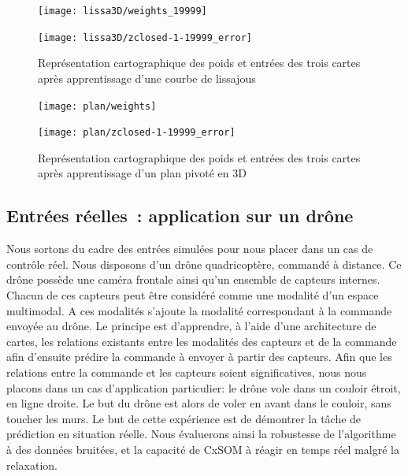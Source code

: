 \documentclass[../main]{subfiles}
\begin{document}
\begin{figure}
\begin{minipage}{0.48\textwidth}
\centering\texttt{[image: lissa3D/weights\_19999]}
\end{minipage}
\begin{minipage}{0.48\textwidth}
\texttt{[image: lissa3D/zclosed-1-19999\_error]}	
\end{minipage}	
\caption{Représentation cartographique des poids et entrées des trois cartes après apprentissage d'une courbe de lissajous}
\end{figure}

\begin{figure}
	\begin{minipage}{0.48\textwidth}
	\centering\texttt{[image: plan/weights]}
	\end{minipage}
	\begin{minipage}{0.48\textwidth}
	\texttt{[image: plan/zclosed-1-19999\_error]}	
	\end{minipage}	
	\caption{Représentation cartographique des poids et entrées des trois cartes après apprentissage d'un plan pivoté en 3D}
	\end{figure}


\subsection{Entrées réelles~: application sur un drône}

Nous sortons du cadre des entrées simulées pour nous placer dans un cas de contrôle réel. Nous disposons d'un drône quadricoptère, commandé à distance. Ce drône possède une caméra frontale ainsi qu'un ensemble de capteurs internes. Chacun de ces capteurs peut être considéré comme une modalité d'un espace multimodal. A ces modalités s'ajoute la modalité correspondant à la commande envoyée au drône.
Le principe est d'apprendre, à l'aide d'une architecture de cartes, les relations existants entre les modalités des capteurs et de la commande afin d'ensuite prédire la commande à envoyer à partir des capteurs.
Afin que les relations entre la commande et les capteurs soient significatives, nous nous placons dans un cas d'application particulier: le drône vole dans un couloir étroit, en ligne droite. Le but du drône est alors de voler en avant dans le couloir, sans toucher les murs.
Le but de cette expérience est de démontrer la tâche de prédiction en situation réelle. Nous évaluerons ainsi la robustesse de l'algorithme à des données bruitées, et la capacité de CxSOM à réagir en temps réel malgré la relaxation.
\end{document}
